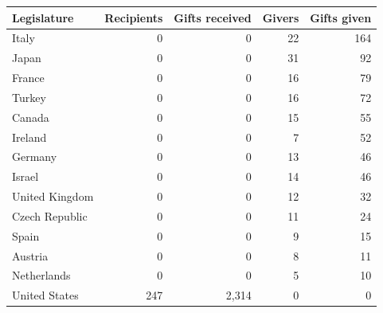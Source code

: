 \begin{tabular}{lrrrr}
\toprule
Legislature & Recipients & Gifts received & Givers & Gifts given \\
\midrule
Italy & 0 & 0 & 22 & 164 \\
Japan & 0 & 0 & 31 & 92 \\
France & 0 & 0 & 16 & 79 \\
Turkey & 0 & 0 & 16 & 72 \\
Canada & 0 & 0 & 15 & 55 \\
Ireland & 0 & 0 & 7 & 52 \\
Germany & 0 & 0 & 13 & 46 \\
Israel & 0 & 0 & 14 & 46 \\
United Kingdom & 0 & 0 & 12 & 32 \\
Czech Republic & 0 & 0 & 11 & 24 \\
Spain & 0 & 0 & 9 & 15 \\
Austria & 0 & 0 & 8 & 11 \\
Netherlands & 0 & 0 & 5 & 10 \\
United States & 247 & 2,314 & 0 & 0 \\
\bottomrule
\end{tabular}
